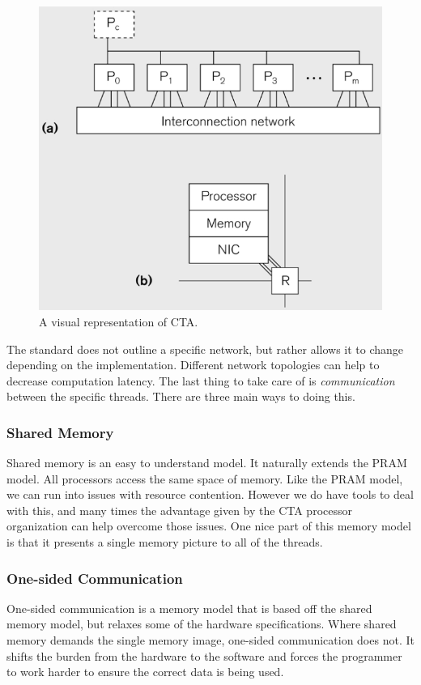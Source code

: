 \documentclass{article}
\begin{document}
	\done{}
	\begin{figure}[h]
    \centering
    \includegraphics[scale=.45]{pic/CTA.jpg}
    \caption{A visual representation of CTA.}
    \end{figure}
	
	The standard does not outline a specific network, but rather allows it to change depending on the implementation. Different network topologies can help to decrease computation latency. The last thing to take care of is {\it communication} between the specific threads. There are three main ways to doing this.

      \subsubsection{Shared Memory}
      Shared memory is an easy to understand model. It naturally extends the PRAM model. All processors access the same space of memory. Like the PRAM model, we can run into issues with resource contention. However we do have tools to deal with this, and many times the advantage given by the CTA processor organization can help overcome those issues. One nice part of this memory model is that it presents a single memory picture to all of the threads.\done{}

      \subsubsection{One-sided Communication}
      One-sided communication is a memory model that is based off the shared memory model, but relaxes some of the hardware specifications. Where shared memory demands the single memory image, one-sided communication does not. It shifts the burden from the hardware to the software and forces the programmer to work harder to ensure the correct data is being used. \done{}
\end{document}
